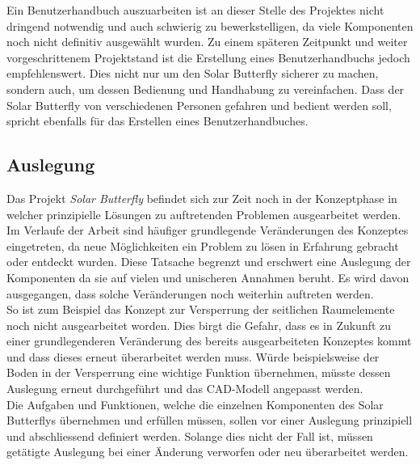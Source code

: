 Ein Benutzerhandbuch auszuarbeiten ist an dieser Stelle des Projektes nicht dringend notwendig und auch schwierig zu bewerkstelligen, da viele Komponenten noch nicht definitiv ausgewählt wurden. Zu einem späteren Zeitpunkt und weiter vorgeschrittenem Projektstand ist die Erstellung eines Benutzerhandbuchs jedoch empfehlenswert. Dies nicht nur um den Solar Butterfly sicherer zu machen, sondern auch, um dessen Bedienung und Handhabung zu vereinfachen. Dass der Solar Butterfly von verschiedenen Personen gefahren und bedient werden soll, spricht ebenfalls für das Erstellen eines Benutzerhandbuches.


\subsection{Auslegung}
Das Projekt \emph{Solar Butterfly} befindet sich zur Zeit noch in der Konzeptphase in welcher prinzipielle Lösungen zu auftretenden Problemen ausgearbeitet werden. Im Verlaufe der Arbeit sind häufiger grundlegende Veränderungen des Konzeptes eingetreten, da neue Möglichkeiten ein Problem zu lösen in Erfahrung gebracht oder entdeckt wurden. Diese Tatsache begrenzt und erschwert eine Auslegung der Komponenten da sie auf vielen und unischeren Annahmen beruht. Es wird davon ausgegangen, dass solche Veränderungen noch weiterhin auftreten werden.\\
So ist zum Beispiel das Konzept zur Versperrung der seitlichen Raumelemente noch nicht ausgearbeitet worden. Dies birgt die Gefahr, dass es in Zukunft zu einer grundlegenderen Veränderung des bereits ausgearbeiteten Konzeptes kommt und dass dieses erneut überarbeitet werden muss. Würde beispielsweise der Boden in der Versperrung eine wichtige Funktion übernehmen, müsste dessen Auslegung erneut durchgeführt und das CAD-Modell angepasst werden.\\
Die Aufgaben und Funktionen, welche die einzelnen Komponenten des Solar Butterflys übernehmen und erfüllen müssen, sollen vor einer Auslegung prinzipiell und abschliessend definiert werden. Solange dies nicht der Fall ist, müssen getätigte Auslegung bei einer Änderung verworfen oder neu überarbeitet werden.

